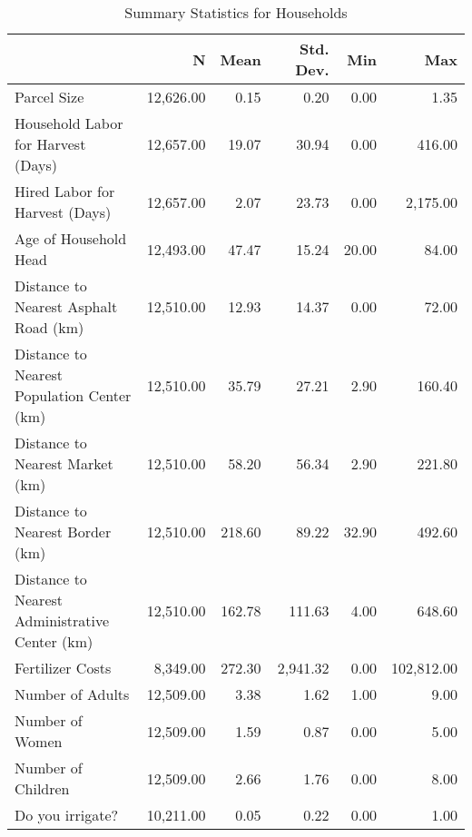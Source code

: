 \begin{table}
\caption{Summary Statistics for Households}
\label{tbl:summary}
\begin{tabular}{lrrrrr}
\toprule
{} & {N} & {Mean} & {Std. Dev.} & {Min} & {Max} \\
\midrule
Parcel Size & 12,626.00 & 0.15 & 0.20 & 0.00 & 1.35 \\
Household Labor for Harvest (Days) & 12,657.00 & 19.07 & 30.94 & 0.00 & 416.00 \\
Hired Labor for Harvest (Days) & 12,657.00 & 2.07 & 23.73 & 0.00 & 2,175.00 \\
Age of Household Head & 12,493.00 & 47.47 & 15.24 & 20.00 & 84.00 \\
Distance to Nearest Asphalt Road (km) & 12,510.00 & 12.93 & 14.37 & 0.00 & 72.00 \\
Distance to Nearest Population Center (km) & 12,510.00 & 35.79 & 27.21 & 2.90 & 160.40 \\
Distance to Nearest Market (km) & 12,510.00 & 58.20 & 56.34 & 2.90 & 221.80 \\
Distance to Nearest Border (km) & 12,510.00 & 218.60 & 89.22 & 32.90 & 492.60 \\
Distance to Nearest Administrative Center (km) & 12,510.00 & 162.78 & 111.63 & 4.00 & 648.60 \\
Fertilizer Costs & 8,349.00 & 272.30 & 2,941.32 & 0.00 & 102,812.00 \\
Number of Adults & 12,509.00 & 3.38 & 1.62 & 1.00 & 9.00 \\
Number of Women & 12,509.00 & 1.59 & 0.87 & 0.00 & 5.00 \\
Number of Children & 12,509.00 & 2.66 & 1.76 & 0.00 & 8.00 \\
Do you irrigate? & 10,211.00 & 0.05 & 0.22 & 0.00 & 1.00 \\
\bottomrule
\end{tabular}
\end{table}
